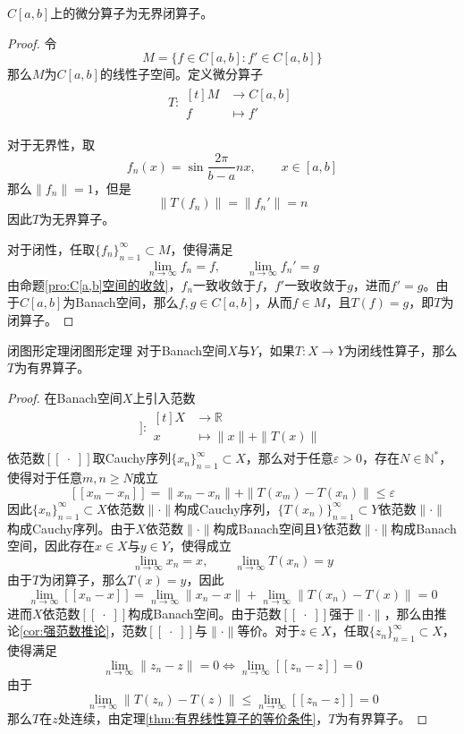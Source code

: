 \documentclass[lang = cn, scheme = chinese, thmcnt = section]{elegantbook}
\newcommand{\N}{\mathbb{N}}            %
\newcommand{\R}{\mathbb{R}}            %
\newcommand{\sub}{\subset}             %
\begin{document}
\begin{proposition}
	$C[a,b]$上的微分算子为无界闭算子。
\end{proposition}

\begin{proof}
	令
	$$
	M=\{ f\in C[a,b]:f'\in C[a,b] \}
	$$
	那么$M$为$C[a,b]$的线性子空间。定义微分算子
	\begin{align*}
		T:\begin{aligned}[t]
			M&\longrightarrow C[a,b]\\
			f&\longmapsto f'
		\end{aligned}
	\end{align*}

	对于无界性，取
	$$
	f_n(x)=\sin\frac{2\pi}{b-a}nx,\qquad x\in [a,b]
	$$
	那么$\|f_n\|=1$，但是
	$$
	\|T(f_n)\|=\|f_n'\|=n
	$$
	因此$T$为无界算子。
	
	对于闭性，任取$\{f_n\}_{n=1}^{\infty}\sub M$，使得满足
	$$
	\lim_{n\to\infty}f_n=f,\qquad 
	\lim_{n\to\infty}f_n'=g
	$$
	由命题\ref{pro:C[a,b]空间的收敛}，$f_n$一致收敛于$f$，$f'$一致收敛于$g$，进而$f'=g$。由于$C[a,b]$为Banach空间，那么$f,g\in C[a,b]$，从而$f\in M$，且$T(f)=g$，即$T$为闭算子。
\end{proof}

\begin{theorem}{闭图形定理}{闭图形定理}
	对于Banach空间$X$与$Y$，如果$T:X\to Y$为闭线性算子，那么$T$为有界算子。
\end{theorem}

\begin{proof}
	在Banach空间$X$上引入范数
	\begin{align*}
		[\![\;\cdot\;]\!]:\begin{aligned}[t]
			X&\longrightarrow\R\\
			x&\longmapsto \|x\|+\|T(x)\|
		\end{aligned}
	\end{align*}
	依范数$[\![\;\cdot\;]\!]$取Cauchy序列$\{x_n\}_{n=1}^{\infty}\sub X$，那么对于任意$\varepsilon>0$，存在$N\in\N^*$，使得对于任意$m,n\ge N$成立
	$$
	[\![x_m-x_n]\!]=\|x_m-x_n\|+\|T(x_m)-T(x_n)\|\le\varepsilon
	$$
	因此$\{x_n\}_{n=1}^{\infty}\sub X$依范数$\|\cdot\|$构成Cauchy序列，$\{T(x_n)\}_{n=1}^{\infty}\sub Y$依范数$\|\cdot\|$构成Cauchy序列。由于$X$依范数$\|\cdot\|$构成Banach空间且$Y$依范数$\|\cdot\|$构成Banach空间，因此存在$x\in X$与$y\in Y$，使得成立
	$$
	\lim_{n\to\infty}x_n=x,\qquad 
	\lim_{n\to\infty}T(x_n)=y
	$$
	由于$T$为闭算子，那么$T(x)=y$，因此
	$$
	\lim_{n\to\infty}[\![x_n-x]\!]=\lim_{n\to\infty}\|x_n-x\|+\lim_{n\to\infty}\|T(x_n)-T(x)\|=0
	$$
	进而$X$依范数$[\![\;\cdot\;]\!]$构成Banach空间。由于范数$[\![\;\cdot\;]\!]$强于$\|\cdot\|$，那么由推论\ref{cor:强范数推论}，范数$[\![\;\cdot\;]\!]$与$\|\cdot\|$等价。对于$z\in X$，任取$\{z_n\}_{n=1}^{\infty}\sub X$，使得满足
	$$
	\lim_{n\to\infty}\|z_n-z\|=0\iff \lim_{n\to\infty}[\![z_n-z]\!]=0
	$$
	由于
	$$
	\lim_{n\to\infty}\|T(z_n)-T(z)\|\le \lim_{n\to\infty}[\![z_n-z]\!]=0
	$$
	那么$T$在$z$处连续，由定理\ref{thm:有界线性算子的等价条件}，$T$为有界算子。
\end{proof}
\end{document}
